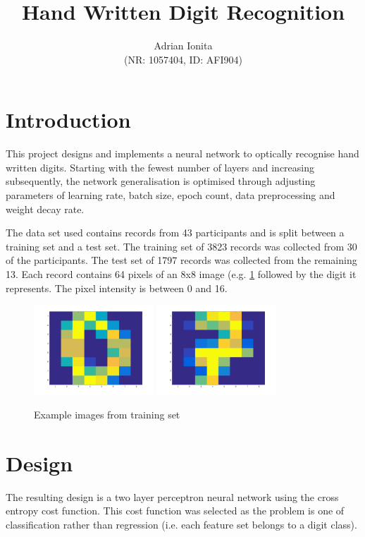 \documentclass[11]{article}
\title{
  Hand Written
  Digit Recognition
  }
\date{}
\author{Adrian Ionita\\
\small{(NR: 1057404, ID: AFI904)}}
\begin{document}
\maketitle 	

\section{Introduction}
This project designs and implements a neural network to optically recognise hand written digits. Starting with the fewest number of layers and increasing subsequently, the network generalisation is optimised through adjusting parameters of learning rate, batch size, epoch count, data preprocessing and weight decay rate.

The data set used contains records from 43 participants and is split between a training set and a test set. The training set of 3823 records was collected from 30 of the participants. The test set of 1797 records was collected from the remaining 13. Each record contains 64 pixels of an 8x8 image (e.g. \ref{fig:digits} followed by the digit it represents. The pixel intensity is between 0 and 16. 

\begin{figure}[h]
\centering
\includegraphics[width=0.4\textwidth]{zero.png}
\includegraphics[width=0.4\textwidth]{seven.png}
\caption{Example images from training set}
\label{fig:digits}
\end{figure}
\section{Design}

The resulting design is a two layer perceptron neural network using the cross entropy cost function. This cost function was selected as the problem is one of classification rather than regression (i.e. each feature set belongs to a digit class).
\end{document}
